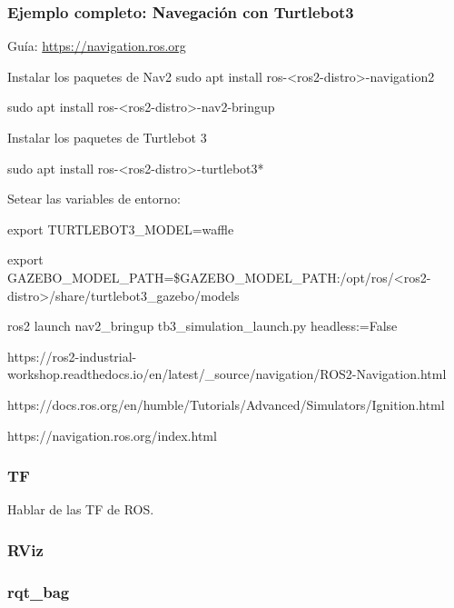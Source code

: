 \begin{frame}
	\frametitle{Ejemplo completo: Navegación con Turtlebot3}
    
    Guía: \href{https://navigation.ros.org}{https://navigation.ros.org}
    
    Instalar los paquetes de Nav2 
    sudo apt install ros-<ros2-distro>-navigation2
    
    sudo apt install ros-<ros2-distro>-nav2-bringup
    
    Instalar los paquetes de Turtlebot 3
    
    sudo apt install ros-<ros2-distro>-turtlebot3*
    
    Setear las variables de entorno:
    
    export TURTLEBOT3\_MODEL=waffle
    
    export GAZEBO\_MODEL\_PATH=\$GAZEBO\_MODEL\_PATH:/opt/ros/<ros2-distro>/share/turtlebot3\_gazebo/models
    
    
    ros2 launch nav2\_bringup tb3\_simulation\_launch.py headless:=False
  
    
    https://ros2-industrial-workshop.readthedocs.io/en/latest/\_source/navigation/ROS2-Navigation.html
    
    https://docs.ros.org/en/humble/Tutorials/Advanced/Simulators/Ignition.html
    
    https://navigation.ros.org/index.html
    
	
\end{frame}

\begin{frame}
	\frametitle{TF}
	Hablar de las TF de ROS.
	
\end{frame}

\begin{frame}
	\frametitle{RViz}

\end{frame}

\begin{frame}
    \frametitle{rqt\_bag}
    

    
\end{frame}

